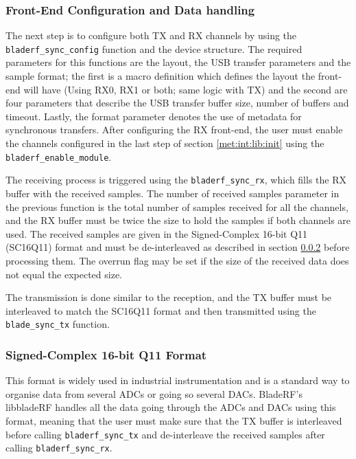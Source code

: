 \documentclass[12pt,a4paper]{report}
\begin{document}
\subsubsection{Front-End Configuration and Data handling} \label{met:int:lib:rx}
The next step is to configure both TX and RX channels by using the \verb|bladerf_sync_config| function and the device structure. The required parameters for this functions are the layout, the USB transfer parameters and the sample format; the first is a macro definition which defines the layout the front-end will have (Using RX0, RX1 or both; same logic with TX) and the second are four parameters that describe the USB transfer buffer size, number of buffers and timeout. Lastly, the format parameter denotes the use of metadata for synchronous transfers. After configuring the RX front-end, the user must enable the channels configured in the last step of section \ref{met:int:lib:init} using the \verb|bladerf_enable_module|. 

The receiving process is triggered using the \verb|bladerf_sync_rx|, which fills the RX buffer with the received samples. The number of received samples parameter in the previous function is the total number of samples received for all the channels, and the RX buffer must be twice the size to hold the samples if both channels are used. The received samples are given in the Signed-Complex 16-bit Q11 (SC16Q11) format and must be de-interleaved as described in section \ref{met:int:lib:sc16q11} before processing them. The overrun flag may be set if the size of the received data does not equal the expected size. \cite{Nuand2019LibbladeRF2.2.1}

The transmission is done similar to the reception, and the TX buffer must be interleaved to match the SC16Q11 format and then transmitted using the \verb|blade_sync_tx| function.

\subsubsection{Signed-Complex 16-bit Q11 Format} \label{met:int:lib:sc16q11}
This format is widely used in industrial instrumentation and is a standard way to organise data from several ADCs or going so several DACs. BladeRF's libbladeRF handles all the data going through the ADCs and DACs using this format, meaning that the user must make sure that the TX buffer is interleaved before calling \verb|bladerf_sync_tx| and de-interleave the received samples after calling \verb|bladerf_sync_rx|.
\end{document}
